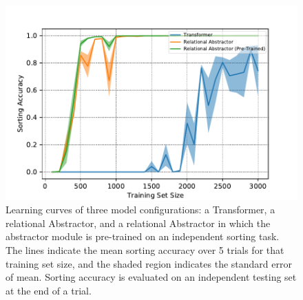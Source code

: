 \begin{figure}[h!]
	\centering
	\includegraphics[width=.8\textwidth]{figures/random_object_argsort_learning_curves.pdf}
	\caption{Learning curves of three model configurations: a Transformer, a relational Abstractor, and a relational Abstractor in which the abstractor module is pre-trained on an independent sorting task. The lines indicate the mean sorting accuracy over 5 trials for that training set size, and the shaded region indicates the standard error of mean. Sorting accuracy is evaluated on an independent testing set at the end of a trial.}
	\label{fig:random_object_argsort_learning_curves}
\end{figure}